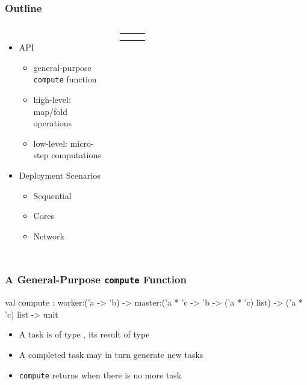 \documentclass[xcolor=dvipsnames]{beamer}
\begin{document}

\begin{frame}\frametitle{Outline}
  \begin{columns}
    \begin{itemize}
    \item API
      \begin{itemize}
      \item general-purpose \texttt{compute} function
      \item high-level: map/fold operations
      \item low-level: micro-step computations
      \end{itemize}


    \item Deployment Scenarios
      \begin{itemize}
      \item Sequential
      \item Cores
      \item Network
      \end{itemize}
    \end{itemize}

  \begin{tabular}{|p{0.2em}|p{0.2em}|p{0.2em}|}
    \hline
    && \\\hline
    && \\\hline
    && \\\hline
  \end{tabular}
\end{columns}
\end{frame}


\begin{frame}\frametitle{A General-Purpose \texttt{compute} Function}
  \begin{ocaml}
    val compute : 
    worker:('a -> 'b) -> 
    master:('a * 'c -> 'b -> ('a * 'c) list) -> 
    ('a * 'c) list -> 
    unit
  \end{ocaml}
  \begin{itemize}
  \item A task is of type , its result of type
  \item A completed task may in turn generate new tasks
  \item \texttt{compute} returns when there is no more task
  \end{itemize}
\end{frame}
\end{document}
